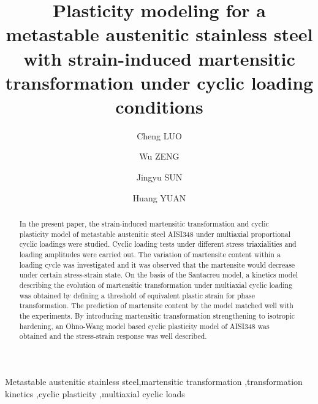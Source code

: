 \documentclass[final,5p,times,onecolumn,10pt,sort&compress]{elsarticle}
\begin{document}
\begin{frontmatter}



\title{Plasticity modeling for a metastable austenitic stainless steel with strain-induced martensitic transformation under cyclic loading conditions}


\author{Cheng LUO}
\author{Wu ZENG}
\author{Jingyu SUN}
\author{Huang YUAN}

\address{School of Aerospace Engineering, Tsinghua University, Beijing, China}

\begin{abstract}
In the present paper, the strain-induced martensitic transformation and cyclic plasticity model of metastable austenitic steel AISI348 under multiaxial proportional cyclic loadings were studied. Cyclic loading tests under different stress triaxialities and loading amplitudes were carried out. The variation of martensite content within a loading cycle was investigated and it was observed that the martensite would decrease under certain stress-strain state. On the basis of the Santacreu model, a kinetics model describing the evolution of martensitic transformation under multiaxial cyclic loading was obtained by defining a threshold of equivalent plastic strain for phase transformation. The prediction of martensite content by the model matched well with the experiments. By introducing martensitic transformation strengthening to isotropic hardening, an Ohno-Wang model based cyclic plasticity model of AISI348 was obtained and the stress-strain response was well described.
\end{abstract}

%
\begin{keyword}
Metastable austenitic stainless steel\sep martensitic transformation \sep transformation kinetics  \sep cyclic plasticity \sep multiaxial cyclic loads

\end{keyword}
\end{frontmatter}
\end{document}
